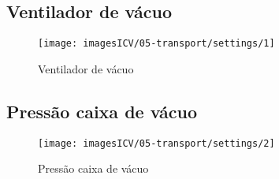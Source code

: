 \usepackage{graphicx}
\newpage
\thispagestyle{fancy}
\vspace{\fill}

\subsection{Ventilador de vácuo}
\begin{figure}
    \centering
    \texttt{[image: imagesICV/05-transport/settings/1]}
    \caption{Ventilador de vácuo}
\end{figure}
\newpage
\thispagestyle{fancy}
\vspace{\fill}

\subsection{Pressão caixa de vácuo}
\begin{figure}
    \centering
    \texttt{[image: imagesICV/05-transport/settings/2]}
    \caption{Pressão caixa de vácuo}
\end{figure}
\newpage
\thispagestyle{fancy}
\vspace{\fill}
